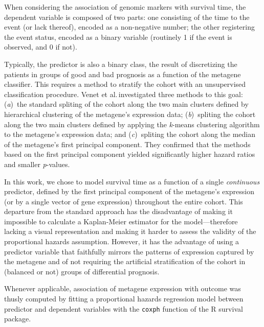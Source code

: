 When considering the association of genomic markers with survival time, the
dependent variable is composed of two parts: one consisting of the time to the
event (or lack thereof), encoded as a non-negative number; the other registering
the event status, encoded as a binary variable (routinely 1 if the event is
observed, and 0 if not).

Typically, the predictor is also a binary class, the result of discretizing the
patients in groups of good and bad prognosis as a function of the metagene
classifier.  This requires a method to stratify the cohort with an unsupervised
classification procedure.  Venet et al.\cite{venet_most_2011}\,investigated
three methods to this goal: (\emph{a})~the standard spliting of the cohort along
the two main clusters defined by hierarchical clustering of the metagene's
expression data;
(\emph{b})~spliting the cohort along the two main clusters defined
by applying the \emph{k}-means clustering algorithm to the metagene's expression
data;
and (\emph{c})~spliting the cohort along the median of the metagene's first
principal component.
They confirmed that the methods based on the first principal
component %
yielded significantly higher hazard ratios and smaller \emph{p}-values.

In this work, we chose to model survival time as a function of a single
\emph{continuous} predictor, defined by the first principal component of the
metagene's expression (or by a single vector of gene expression) throughout the
entire cohort.  This departure from the standard approach has the disadvantage
of making it impossible to calculate a Kaplan-Meier estimator for the
model---therefore lacking a visual representation and making it harder to assess
the validity of the proportional hazards assumption.  However, it has the
advantage of using a predictor variable that faithfully mirrors the patterns of
expression captured by the metagene and of not requiring the artificial
stratification of the cohort in (balanced or not) groups of differential
prognosis.

Whenever applicable, association of metagene expression with outcome was thusly
computed by fitting a proportional hazards regression model between predictor
and dependent variables with the \texttt{coxph} function of the \textsf{R}
\textsf{survival} package.


